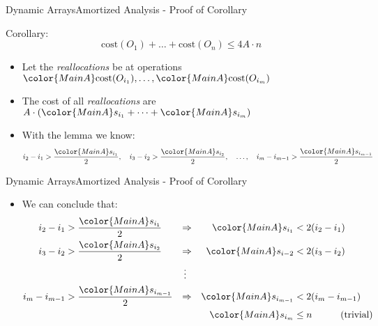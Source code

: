 \begin{frame}{Dynamic Arrays}{Amortized Analysis - Proof of Corollary}
  \begin{block}{Corollary:}
    \begin{displaymath}
      \mathrm{cost}(O_1)+\dots+\mathrm{cost}(O_n) \leq 4 A \cdot n
    \end{displaymath}
  \end{block}
  \begin{itemize}
    \item
      Let the \textit{reallocations} be at operations
      \begin{math}
        {\color{MainA}\mathrm{cost}(O_{i_1})},\dots,
        {\color{MainA}\mathrm{cost}(O_{i_m})}
      \end{math}
    \item
      The {\color{MainA}cost} of all \textit{reallocations} are
      \begin{math}
        A \cdot \left(
          {\color{MainA}s_{i_1}}+\dots+{\color{MainA}s_{i_m}}
        \right)
      \end{math}
    \item
      With the lemma we know:
      \begin{displaymath}
        i_2-i_1 > \frac{\color{MainA}s_{i_1}}{2},\hspace{1.0em}
        i_3-i_2 > \frac{\color{MainA}s_{i_2}}{2},\hspace{1.0em}
        \dotsc,\hspace{1.0em}
        i_m-i_{m-1} > \frac{\color{MainA}s_{i_{m-1}}}{2}
      \end{displaymath}
  \end{itemize}
\end{frame}


\begin{frame}{Dynamic Arrays}{Amortized Analysis - Proof of Corollary}
  \begin{itemize}
    \item
      We can conclude that:
      \begin{align*}
        i_2-i_1 &> \frac{\color{MainA}s_{i_1}}{2} &
        \Rightarrow &&
        {\color{MainA}s_{i_1}} &< 2 (i_2 - i_1)\\
        i_3-i_2 &> \frac{\color{MainA}s_{i_2}}{2} &
        \Rightarrow &&
        {\color{MainA}s_{i-2}} &< 2 (i_3 - i_2)\\
        {} & {} & \vdots\;\;\\
        i_m-i_{m-1} &> \frac{\color{MainA}s_{i_{m-1}}}{2} &
        \Rightarrow &&
        {\color{MainA}s_{i_{m-1}}} &< 2 (i_m - i_{m-1})\\
        {} & {} & {} &&
        {\color{MainA}s_{i_m}} &\leq n
        \hspace*{3.0em}\text{(trivial)}
      \end{align*}
  \end{itemize}
\end{frame}

